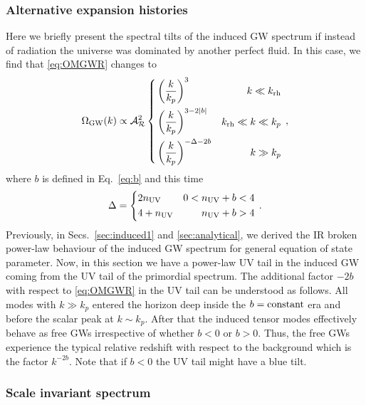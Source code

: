\documentclass[a4paper,11pt]{article}
\numberwithin{equation}{section}
\begin{document}
\subsubsection{Alternative expansion histories}
Here we briefly present the spectral tilts of the induced GW spectrum if instead of radiation the universe was dominated by another perfect fluid. In this case, we find that \eqref{eq:OMGWR} changes to \cite{Atal:2021jyo}
\begin{align}\label{eq:OMGWGB}
\Omega_{\rm GW}(k)\propto{\cal A}^2_{\cal R}\left\{
\begin{aligned}
&\left(\frac{k}{k_p}\right)^{3}&k\ll k_{\rm rh}\\
&\left(\frac{k}{k_p}\right)^{3-2|b|}&k_{\rm rh}\ll k\ll k_p\\
&\left(\frac{k}{k_p}\right)^{-\Delta-2b}& k\gg k_p
\end{aligned}
\right.\,,
\end{align}
where $b$ is defined in Eq.~\eqref{eq:b} and this time
\begin{align}
\Delta=\left\{
\begin{aligned}
&2n_{\rm UV} & 0<n_{\rm UV}+b<4\\
&4+n_{\rm UV}& n_{\rm UV}+b>4
\end{aligned} 
\right.\,.
\end{align}
Previously, in Secs.~\ref{sec:induced1} and \ref{sec:analytical}, we derived the IR broken power-law behaviour of the induced GW spectrum for general equation of state parameter. Now, in this section we have a power-law UV tail in the induced GW coming from the UV tail of the primordial spectrum. The additional factor $-2b$ with respect to \eqref{eq:OMGWR} in the UV tail can be understood as follows. All modes with $k\gg k_p$ entered the horizon deep inside the $b={\rm constant}$ era and before the scalar peak at $k\sim k_p$. After that the induced tensor modes effectively behave as free GWs irrespective of whether $b<0$ or $b>0$. Thus, the free GWs experience the typical relative redshift with respect to the background which is the factor $k^{-2b}$. Note that if $b<0$ the UV tail might have a blue tilt.

\subsubsection{Scale invariant spectrum \label{sec:flat}}
\end{document}
